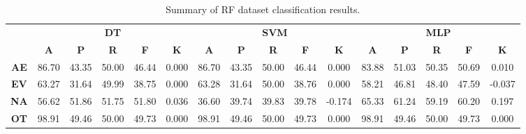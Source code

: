 \begin{landscape}
\begin{table}[htbp]
\footnotesize
\centering
\caption{Summary of RF dataset classification results.}
\label{tab:base_female}
\begin{tabular}{|c|c|c|c|c|c|c|c|c|c|c|c|c|c|c|c|}
\hline
\multirow{2}{*}{}	& \multicolumn{5}{c|}{\textbf{DT}}												& \multicolumn{5}{c|}{\textbf{SVM}}												& \multicolumn{5}{c|}{\textbf{MLP}}												\\ \cline{2-16} 
					& \textbf{A}	& \textbf{P}	& \textbf{R}	& \textbf{F}	& \textbf{K}	& \textbf{A}	& \textbf{P}	& \textbf{R}	& \textbf{F}	& \textbf{K}	& \textbf{A}	& \textbf{P}	& \textbf{R}	& \textbf{F}	& \textbf{K}	\\ \hline
\textbf{AE}			& 86.70			& 43.35			& 50.00			& 46.44			& 0.000			& 86.70			& 43.35			& 50.00			& 46.44			& 0.000			& 83.88			& 51.03			& 50.35			& 50.69			& 0.010			\\ \hline
\textbf{EV}			& 63.27			& 31.64			& 49.99			& 38.75			& 0.000			& 63.28			& 31.64			& 50.00			& 38.76			& 0.000			& 58.21			& 46.81			& 48.40			& 47.59			& -0.037			\\ \hline
\textbf{NA}			& 56.62			& 51.86			& 51.75			& 51.80			& 0.036			& 36.60			& 39.74			& 39.83			& 39.78			& -0.174			& 65.33			& 61.24			& 59.19			& 60.20			& 0.197			\\ \hline
\textbf{OT}			& 98.91			& 49.46			& 50.00			& 49.73			& 0.000			& 98.91			& 49.46			& 50.00			& 49.73			& 0.000			& 98.91			& 49.46			& 50.00			& 49.73			& 0.000			\\ \hline
\end{tabular}
\end{table}
\end{landscape}